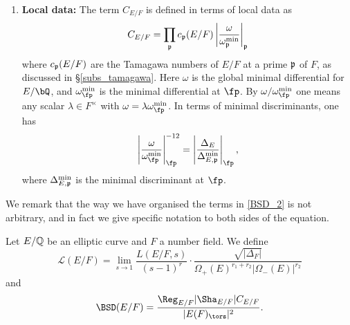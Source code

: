 \begin{enumerate}
    \item \textbf{Local data:} The term $C_{E/F}$ is defined in terms of local data as 
    \begin{equation}\label{fudge-factor}
    C_{E/F}=\prod_{\mathfrak{p}}c_{\mathfrak{p}}(E/F)\left|\frac{\omega}{\omega_{\mathfrak{p}}^{\min}}\right|_{\mathfrak{p}}
    \end{equation}
    where $c_{\mathfrak{p}}(E/F)$ are the Tamagawa numbers of $E/F$ at a prime $\mathfrak{p}$ of $F$, as discussed in \S\ref*{subs_tamagawa}.
    Here $\omega$ is the global minimal differential for $E / \bQ$, and $\omega_{\fp}^{\min}$ is the minimal differential at $\fp$. By $\omega / \omega_{\fp}^{\min}$ one means any scalar $\lambda \in F^{\times}$ with $\omega = \lambda \omega_{\fp}^{\min}$. In terms of minimal discriminants, one has
    \[ \left| \frac{\omega}{\omega_{\fp}^{\min}} \right|_{\fp}^{-12} = \left|\frac{\Delta_E}{\Delta_{E, \pp}^{\min}} \right|_{\fp}, \]
    where $\Delta_{E, \mathfrak{p}}^{\min}$ is the minimal discriminant at $\fp$.    
\end{enumerate}

We remark that the way we have organised the terms in \eqref{BSD_2} is not arbitrary, and in fact we give specific notation to both sides of the equation. 

\begin{notation}
    Let $E/\mathbb{Q}$ be an elliptic curve and $F$ a number field. We define 
    $$\mathcal{L}(E/F)=\lim_{s\to1}\frac{L(E/F,s)}{(s-1)^r}\cdot\frac{\sqrt{|\Delta_F|}}{\Omega_+(E)^{r_1+r_2}|\Omega_-(E)|^{r_2}}$$
    and
    $$\BSD(E/F)=\frac{\Reg_{E/F}|\Sha_{E/F}|C_{E/F}}{|E(F)_{\tors}|^2}.$$
\end{notation}


